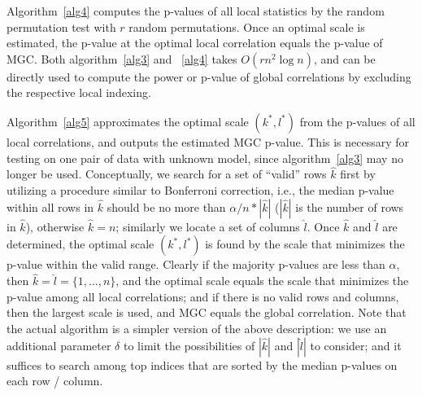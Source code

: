 \documentclass[11pt]{article}
\begin{document}
Algorithm~\ref{alg4} computes the p-values of all local statistics by the random permutation test with $r$ random permutations. Once an optimal scale is estimated, the p-value at the optimal local correlation equals the p-value of MGC. Both algorithm~\ref{alg3} and ~\ref{alg4} takes $O(rn^2 \log n)$, and can be directly used to compute the power or p-value of global correlations by excluding the respective local indexing.

Algorithm~\ref{alg5} approximates the optimal scale $(k^{*},l^{*})$ from the p-values of all local correlations, and outputs the estimated MGC p-value. This is necessary for testing on one pair of data with unknown model, since algorithm~\ref{alg3} may no longer be used. Conceptually, we search for a set of ``valid'' rows $\hat{k}$ first by utilizing a procedure similar to Bonferroni correction, i.e., the median p-value within all rows in $\hat{k}$ should be no more than $\alpha /n * |\hat{k}|$ ($|\hat{k}|$ is the number of rows in $\hat{k}$), otherwise $\hat{k}=n$; similarly we locate a set of columns $\hat{l}$. Once $\hat{k}$ and $\hat{l}$ are determined, the optimal scale $(k^{*},l^{*})$ is found by the scale that minimizes the p-value within the valid range. Clearly if the majority p-values are less than $\alpha$, then $\hat{k}=\hat{l}=\{1,\ldots,n\}$, and the optimal scale equals the scale that minimizes the p-value among all local correlations; and if there is no valid rows and columns, then the largest scale is used, and MGC equals the global correlation. Note that the actual algorithm is a simpler version of the above description: we use an additional parameter $\delta$ to limit the possibilities of $|\hat{k}|$ and $|\hat{l}|$ to consider; and it suffices to search among top indices that are sorted by the median p-values on each row / column.

%
%
%
%
%
%
\end{document}
